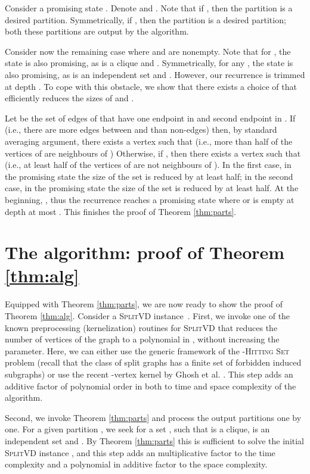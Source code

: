 \documentclass{article}
\newcommand{\splitvd}{\textsc{SplitVD}\xspace}
\theoremstyle{definition}
\begin{document}
Consider a promising state .
Denote  and . Note that if , then the
partition  is a desired partition. Symmetrically, if , then the partition
 is a desired partition; both these partitions are output by the algorithm.

Consider now the remaining case where  and  are nonempty.
Note that for , the state
 is also promising, as  is a clique and .
Symmetrically, for any , the state  is also promising,
as  is an independent set and .
However, our recurrence is trimmed at depth .
To cope with this obstacle, we show that
there exists a choice of  that efficiently reduces the sizes of  and .

Let  be the set of edges of 
that have one endpoint in  and second endpoint in . If 
(i.e., there are more edges between  and  than non-edges) then,
by standard averaging argument, there exists a vertex  such that  (i.e., more than
 half of the vertices of  are neighbours of )
Otherwise, if , then there exists a vertex  such that 
(i.e., at least half of the vertices of  are not neighbours of ).
In the first case, in the promising state  the size of the set  is reduced by at least half; in the second case,
in the promising state  the size of the set  is reduced by at least half. 
At the beginning, , thus the recurrence reaches a promising state where  or  is empty at depth
at most . This finishes the proof of Theorem \ref{thm:parts}.

\section{The algorithm: proof of Theorem \ref{thm:alg}}\label{sec:alg}
\label{sec:proof-1.1}

Equipped with Theorem \ref{thm:parts}, we are now ready to show the proof of Theorem \ref{thm:alg}.
  Consider a \splitvd instance~.
First, we invoke one of the known preprocessing (kernelization) routines for \splitvd that reduces the number of vertices of the graph to a polynomial in , without increasing the parameter.
Here, we can either use the generic framework of the -\textsc{Hitting Set} problem \cite{hitting-set}
(recall that the class of split graphs has a finite set of forbidden induced subgraphs)
or use the recent -vertex kernel by Ghosh et al. \cite{ashutosh}.
This step adds an additive factor of polynomial order in  both to time and space complexity of the algorithm.

Second, we invoke Theorem \ref{thm:parts} and process the output partitions one by one.
For a given partition , we seek for a set , such that  is a clique,
 is an independent set and .
By Theorem \ref{thm:parts} this is sufficient to solve the initial \splitvd instance ,
and this step adds an  multiplicative factor to the time complexity and
a polynomial in  additive factor to the space complexity.
\end{document}
